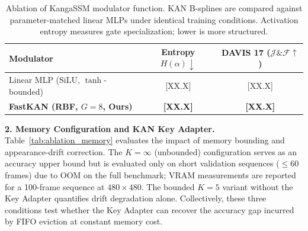\documentclass[sigconf]{acmart}
\begin{document}

\begin{table}[h]
\centering
\caption{Ablation of KangaSSM modulator function. KAN B-splines are compared against parameter-matched linear MLPs under identical training conditions. Activation entropy measures gate specialization; lower is more structured.}
\label{tab:ablation_kan}
\begin{tabular}{lcc}
\toprule
\textbf{Modulator} & \textbf{Entropy $H(\alpha) \downarrow$} & \textbf{DAVIS 17 ($\mathcal{J}\&\mathcal{F} \uparrow$)} \\
\midrule
Linear MLP (SiLU, $\tanh$-bounded) & [XX.X] & [XX.X] \\
\textbf{FastKAN (RBF, $G=8$, Ours)} & \textbf{[XX.X]} & \textbf{[XX.X]} \\
\bottomrule
\end{tabular}
\end{table}

\textbf{2. Memory Configuration and KAN Key Adapter.}
Table~\ref{tab:ablation_memory} evaluates the impact of memory bounding and appearance-drift correction. The $K=\infty$ (unbounded) configuration serves as an accuracy upper bound but is evaluated only on short validation sequences ($\leq 60$ frames) due to OOM on the full benchmark; VRAM measurements are reported for a 100-frame sequence at $480\times480$. The bounded $K=5$ variant without the Key Adapter quantifies drift degradation alone. Collectively, these three conditions test whether the Key Adapter can recover the accuracy gap incurred by FIFO eviction at constant memory cost.

\begin{table}[h]
\centering
\caption{Memory configuration ablation on DAVIS 2017. Peak VRAM is measured at 100 frames, $480\times480$. $K=\infty$ is evaluated on sequences $\leq60$ frames only due to hardware constraints.}
\label{tab:ablation_memory}
\end{table}
\end{document}
